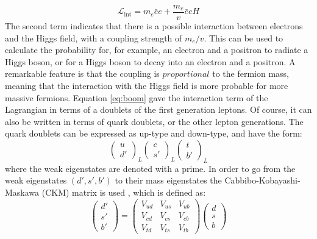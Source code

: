 \begin{equation}
\mathcal{L}_{\mathrm{int}}=m_{e}\bar{e}e+ \frac{m_{e}}{v}\bar{e}eH
\end{equation}
The second term indicates that there is a possible interaction between electrons and the Higgs field, with a coupling strength of $m_{e}/v$. 
This can be used to calculate the probability for, for example, an electron and a positron to radiate a Higgs boson, or for a Higgs boson to decay into an electron and a positron. 
A remarkable feature is that the coupling is $proportional$ to the fermion mass, meaning that the interaction with the Higgs field is more probable for more massive fermions. 
\newpara
\noindent\justify
Equation \ref{eq:boom} gave the interaction term of the Lagrangian in terms of a doublets of the first generation leptons. 
Of course, it can also be written in terms of quark doublets, or the other lepton generations. 
The quark doublets can be expressed as up-type and down-type, and have the form:
\begin{equation}
\begin{pmatrix} u \\ d'\end{pmatrix}_{L}\begin{pmatrix} c \\ s'\end{pmatrix}_{L} \begin{pmatrix} t \\ b'\end{pmatrix}_{L} 
\end{equation}
where the weak eigenstates are denoted with a prime. 
In order to go from the weak eigenstates $(d',s',b')$ to their mass eigenstates the Cabbibo-Kobayashi-Maskawa (CKM) matrix is used \cite{PhysRevLett.10.531}, which is defined as:
\begin{equation}
\begin{pmatrix} d' \\ s' \\ b'\end{pmatrix} = \begin{pmatrix} V_{ud} & V_{us} & V_{ub} \\ V_{cd} & V_{cs} & V_{cb} \\ V_{td} & V_{ts} & V_{tb} \end{pmatrix}\begin{pmatrix} d \\ s \\ b\end{pmatrix}
\end{equation}
